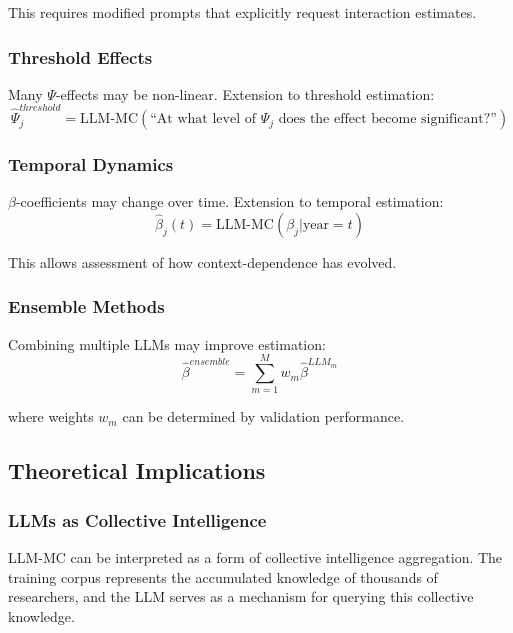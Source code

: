 This requires modified prompts that explicitly request interaction estimates.

\subsubsection{Threshold Effects}

Many $\Psi$-effects may be non-linear. Extension to threshold estimation:
\begin{equation}
\hat{\Psi}_j^{threshold} = \text{LLM-MC}(\text{``At what level of } \Psi_j \text{ does the effect become significant?''})
\end{equation}

\subsubsection{Temporal Dynamics}

$\beta$-coefficients may change over time. Extension to temporal estimation:
\begin{equation}
\hat{\beta}_j(t) = \text{LLM-MC}(\beta_j | \text{year} = t)
\end{equation}

This allows assessment of how context-dependence has evolved.

\subsubsection{Ensemble Methods}

Combining multiple LLMs may improve estimation:
\begin{equation}
\hat{\beta}^{ensemble} = \sum_{m=1}^{M} w_m \hat{\beta}^{LLM_m}
\end{equation}

where weights $w_m$ can be determined by validation performance.

\subsection{Theoretical Implications}

\subsubsection{LLMs as Collective Intelligence}

LLM-MC can be interpreted as a form of collective intelligence aggregation. The training corpus represents the accumulated knowledge of thousands of researchers, and the LLM serves as a mechanism for querying this collective knowledge.

